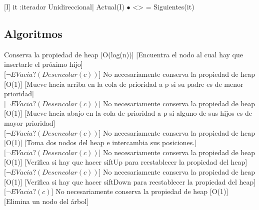 \begin{Representacion}
[I]{ it :iterador Unidireccional| Actual(I) $\bullet$ <> = Siguientes(it)}

\subsection{Algoritmos}


{Conserva la propiedad de heap}
[O(log(n))]
[Encuentra el nodo al cual hay que insertarle el próximo hijo]\\

[$\neg EVacia?(Desencolar(c))$]
{No necesariamente conserva la propiedad de heap}
[O(1)]
[Mueve hacia arriba en la cola de prioridad a p si su padre es de menor prioridad]\\

[$\neg EVacia?(Desencolar(c))$]
{No necesariamente conserva la propiedad de heap}
[O(1)]
[Mueve hacia abajo en la cola de prioridad a p si alguno de sus hijos es de mayor prioridad]\\

[$\neg EVacia?(Desencolar(c))$]
{No necesariamente conserva la propiedad de heap}
[O(1)]
[Toma dos nodos del heap e intercambia sus posiciones.]\\

[$\neg EVacia?(Desencolar(c))$]
{No necesariamente conserva la propiedad de heap}
[O(1)]
[Verifica si hay que hacer siftUp para reestablecer la propiedad del heap]\\

[$\neg EVacia?(Desencolar(c))$]
{No necesariamente conserva la propiedad de heap}
[O(1)]
[Verifica si hay que hacer siftDown para reestablecer la propiedad del heap]\\

[$\neg EVacia?(c)$]
{No necesariamente conserva la propiedad de heap}
[O(1)]
[Elimina un nodo del árbol]\\


\end{Representacion}
